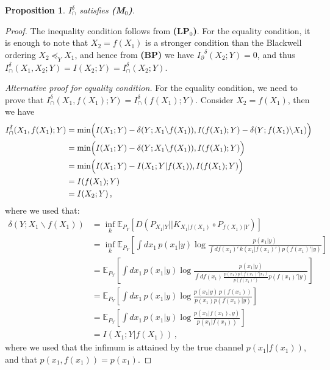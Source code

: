 \documentclass{article}
\newcommand{\ts}[1]{\ensuremath{_{\text{#1}}}}
\newcommand{\Ip}{\ensuremath{I_\partial}\xspace}
\newcommand{\Mz}{\textbf{(M\ts{0})}\xspace} %
\newcommand{\LPz}{\textbf{(LP\ts{0})}\xspace} %
\newcommand{\BP}{\textbf{(BP)}\xspace} %
\newcommand{\Idelta}{\ensuremath{I_\cap^{\delta}}\xspace}
\newcommand{\Ideltas}{\ensuremath{I_\cap^{\delta}(X_1,X_2;Y)}\xspace}
\newtheorem{proposition}{Proposition}
\begin{document}
\begin{proposition} \label{prop:Delta-Mz}
    $\Idelta$ satisfies \Mz.
\end{proposition}
\begin{proof}
    The inequality condition follows from \LPz. For the equality condition, it is enough to note that $X_2=f(X_1)$ is a stronger condition than the Blackwell ordering $X_2\preceq_Y X_1$, and hence from \BP we have $\Ip^\delta(X_2;Y)=0$, and thus $\Ideltas = I(X_2;Y)=\Idelta(X_2;Y)$.

    \textit{Alternative proof for equality condition.}
    For the equality condition, we need to prove that $\Idelta(X_1, f(X_1); Y)=\Idelta(f(X_1); Y)$.
    Consider $X_2=f(X_1)$, then we have
    \begin{equation}
        \begin{aligned}
            \Idelta(X_1, f(X_1); Y) & = \min \Bigl(I(X_1;Y)-\delta(Y;X_1\backslash f(X_1)), I(f(X_1);Y)-\delta(Y;f(X_1)\backslash X_1)\Bigr) \\
            & = \min \Bigl(I(X_1;Y)-\delta(Y;X_1\backslash f(X_1)), I(f(X_1);Y)\Bigr) \\
            & = \min \Bigl(I(X_1;Y)-I(X_1;Y|f(X_1)), I(f(X_1);Y)\Bigr) \\
            & = I(f(X_1);Y) \\
            & = I(X_2;Y) \,,
        \end{aligned}
    \end{equation}
    where we used that:
    \begin{equation}
        \begin{aligned}
            \delta(Y;X_1\backslash f(X_1)) & =\inf_k \mathbb{E}_{P_Y}\left[D(P_{X_1|Y}||K_{X_1|f(X_1)}\circ P_{f(X_1)|Y})\right] \\
            & = \inf_k \mathbb{E}_{P_Y}\left[\int dx_1 \,p(x_1|y)\log\frac{p(x_1|y)}{\int d{f(x_1)'} \,k(x_1|{f(x_1)'})p({f(x_1)'}|y)}\right] \\
            & = \mathbb{E}_{P_Y}\left[\int dx_1 \,p(x_1|y)\log\frac{p(x_1|y)}{\int df(x_1) \,\frac{p(x_1)p(f(x_1)'|x_1)}{p(f(x_1)')}p(f(x_1)'|y)}\right] \\
            & = \mathbb{E}_{P_Y}\left[\int dx_1 \,p(x_1|y)\log\frac{p(x_1|y)\,p(f(x_1))}{p(x_1)p(f(x_1)|y)}\right] \\
            & = \mathbb{E}_{P_Y}\left[\int dx_1 \,p(x_1|y)\log\frac{p(x_1|f(x_1),y)}{p(x_1|f(x_1))}\right] \\
            & = I(X_1;Y|f(X_1)) \,,
        \end{aligned}
    \end{equation}
    where we used that the infimum is attained by the true channel $p(x_1|f(x_1))$, and that $p(x_1,f(x_1))=p(x_1)$.
\end{proof}
\end{document}
